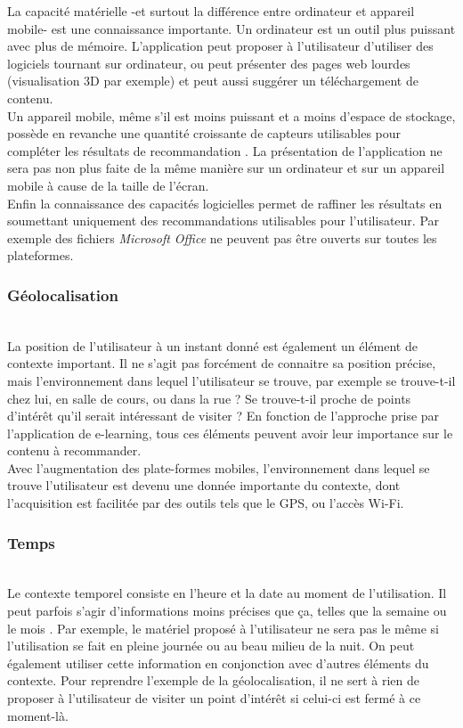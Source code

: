 \documentclass[conference]{./sty/IEEEtran}
\begin{document}
La capacité matérielle -et surtout la différence entre ordinateur et appareil
mobile- est une connaissance importante. Un ordinateur est un outil plus
puissant avec plus de mémoire. L'application peut proposer à l'utilisateur
d'utiliser des logiciels tournant sur ordinateur, ou peut présenter des pages
web lourdes (visualisation 3D par exemple) et peut aussi suggérer un
téléchargement de contenu. \\
Un appareil mobile, même s'il est moins puissant et a moins d'espace de
stockage, possède en revanche une quantité croissante de capteurs utilisables
pour compléter les résultats de recommandation \cite{DBLP:conf/wstst/Kurti08}.
La présentation de l'application ne sera pas non plus faite de la même manière
sur un ordinateur et sur un appareil mobile à cause de la taille de l'écran. \\

Enfin la connaissance des capacités logicielles permet de raffiner les résultats
en soumettant uniquement des recommandations utilisables pour l'utilisateur.
Par exemple des fichiers \emph{Microsoft Office} ne peuvent pas être ouverts sur
toutes les plateformes. \\

\subsubsection{Géolocalisation}
~\\
La position de l'utilisateur à un instant donné est également un élément de contexte important. Il ne s'agit pas forcément de connaitre sa position précise, mais l'environnement dans lequel l'utilisateur se trouve, par exemple se trouve-t-il chez lui, en salle de cours, ou dans la rue ? Se trouve-t-il proche de points d'intérêt qu'il serait intéressant de visiter ? En fonction de l'approche prise par l'application de e-learning, tous ces éléments peuvent avoir leur importance sur le contenu à recommander.\\
Avec l'augmentation des plate-formes mobiles, l'environnement dans lequel se trouve l'utilisateur est devenu une donnée importante du contexte, dont l'acquisition est facilitée par des outils tels que le GPS, ou l'accès Wi-Fi.\cite{DBLP:journals/tlt/VerbertMOWDBD12}\\

\subsubsection{Temps}
~\\
Le contexte temporel consiste en l'heure et la date au moment de l'utilisation. Il peut parfois s'agir d'informations moins précises que ça, telles que la semaine ou le mois \cite{DBLP:journals/tlt/VerbertMOWDBD12}. Par exemple, le matériel proposé à l'utilisateur ne sera pas le même si l'utilisation se fait en pleine journée ou au beau milieu de la nuit. On peut également utiliser cette information en conjonction avec d'autres éléments du contexte. Pour reprendre l'exemple de la géolocalisation, il ne sert à rien de proposer à l'utilisateur de visiter un point d'intérêt si celui-ci est fermé à ce moment-là.\\
\end{document}
